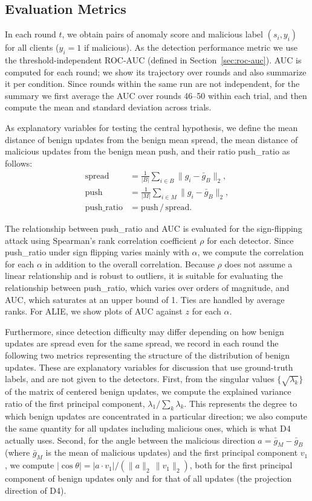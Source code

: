 \documentclass[a4paper,10pt]{article}
\newcommand{\PushRatio}{\textrm{push\_ratio}}
\newcommand{\Spread}{\textrm{spread}}
\newcommand{\Push}{\textrm{push}}
\begin{document}
\subsection{Evaluation Metrics}
\label{sec:metrics}

In each round $t$, we obtain pairs of anomaly score and malicious label $(s_i, y_i)$ for all clients ($y_i = 1$ if malicious). As the detection performance metric we use the threshold-independent ROC-AUC (defined in Section~\ref{sec:roc-auc}). AUC is computed for each round; we show its trajectory over rounds and also summarize it per condition. Since rounds within the same run are not independent, for the summary we first average the AUC over rounds 46--50 within each trial, and then compute the mean and standard deviation across trials.

As explanatory variables for testing the central hypothesis, we define the mean distance of benign updates from the benign mean \Spread{}, the mean distance of malicious updates from the benign mean \Push{}, and their ratio \PushRatio{} as follows:
\begin{align*}
  \Spread &= \tfrac{1}{|B|}\textstyle\sum_{i \in B}\|g_i - \bar{g}_B\|_2, \\
  \Push   &= \tfrac{1}{|M|}\textstyle\sum_{i \in M}\|g_i - \bar{g}_B\|_2, \\
  \PushRatio &= \Push\,/\,\Spread.
\end{align*}

The relationship between \PushRatio{} and AUC is evaluated for the sign-flipping attack using Spearman's rank correlation coefficient $\rho$ for each detector. Since \PushRatio{} under sign flipping varies mainly with $\alpha$, we compute the correlation for each $\alpha$ in addition to the overall correlation. Because $\rho$ does not assume a linear relationship and is robust to outliers, it is suitable for evaluating the relationship between \PushRatio{}, which varies over orders of magnitude, and AUC, which saturates at an upper bound of 1. Ties are handled by average ranks. For ALIE, we show plots of AUC against $z$ for each $\alpha$.

Furthermore, since detection difficulty may differ depending on how benign updates are spread even for the same \Spread{}, we record in each round the following two metrics representing the structure of the distribution of benign updates. These are explanatory variables for discussion that use ground-truth labels, and are not given to the detectors. First, from the singular values $\{\sqrt{\lambda_k}\}$ of the matrix of centered benign updates, we compute the explained variance ratio of the first principal component, $\lambda_1 / \sum_k \lambda_k$. This represents the degree to which benign updates are concentrated in a particular direction; we also compute the same quantity for all updates including malicious ones, which is what D4 actually uses. Second, for the angle between the malicious direction $a = \bar{g}_M - \bar{g}_B$ (where $\bar{g}_M$ is the mean of malicious updates) and the first principal component $v_1$, we compute $|\cos\theta| = |a \cdot v_1| / (\|a\|_2\,\|v_1\|_2)$, both for the first principal component of benign updates only and for that of all updates (the projection direction of D4).
\end{document}
